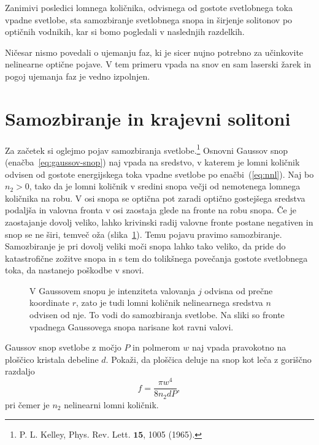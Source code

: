 Zanimivi posledici lomnega količnika, odvisnega od gostote svetlobnega toka vpadne svetlobe, 
sta samozbiranje svetlobnega snopa in širjenje solitonov po optičnih vodnikih, 
kar si bomo pogledali v naslednjih razdelkih.

\begin{remark}
Ničesar nismo povedali o ujemanju faz, ki je sicer nujno potrebno za učinkovite nelinearne 
optične pojave. V tem primeru vpada na snov en sam laserski žarek in pogoj ujemanja faz
je vedno izpolnjen. 
\end{remark}

\section{Samozbiranje in krajevni solitoni}
Za začetek si oglejmo pojav samozbiranja svetlobe.\footnote{P. L. Kelley, Phys. Rev. Lett. $\mathbf{15}$,
1005 (1965).}
Osnovni Gaussov snop 
(enačba~\ref{eq:gaussov-snop}) naj vpada na sredstvo, v katerem je lomni 
količnik odvisen od gostote energijskega toka vpadne svetlobe po enačbi~(\ref{eq:nnl}).
Naj bo $n_{2}>0$, tako da je lomni količnik v sredini snopa večji 
od nemotenega lomnega količnika na robu. V osi snopa se optična pot 
zaradi optično gostejšega sredstva podaljša in valovna fronta 
v osi zaostaja glede na fronte na robu snopa. Če je zaostajanje dovolj veliko,
lahko krivinski radij valovne fronte postane negativen in snop se
ne širi, temveč oža (slika~\ref{fig:sf1}). Temu pojavu pravimo 
samozbiranje. Samozbiranje je pri dovolj
veliki moči snopa lahko tako veliko, da pride do katastrofične zožitve snopa
in s tem do tolikšnega povečanja gostote svetlobnega toka, da nastanejo
poškodbe v snovi.
\begin{figure}[h]
\centering
\def\svgwidth{95truemm} 

\caption{V Gaussovem snopu je intenziteta valovanja $j$ odvisna od prečne koordinate $r$, 
zato je tudi lomni količnik nelinearnega sredstva  $n$ odvisen od nje. To vodi do 
 samozbiranja svetlobe. Na sliki so fronte vpadnega Gaussovega snopa narisane kot ravni valovi.}
\label{fig:sf1}
\end{figure}
\begin{definition}
Gaussov snop svetlobe z močjo $P$ in polmerom $w$ naj vpada pravokotno na ploščico
kristala debeline $d$. Pokaži, da ploščica deluje na snop kot leča z goriščno razdaljo 
\begin{equation}
f = \frac{\pi w^4}{8 n_2 d P},
\end{equation}
pri čemer je $n_2$ nelinearni lomni količnik.
\end{definition}


